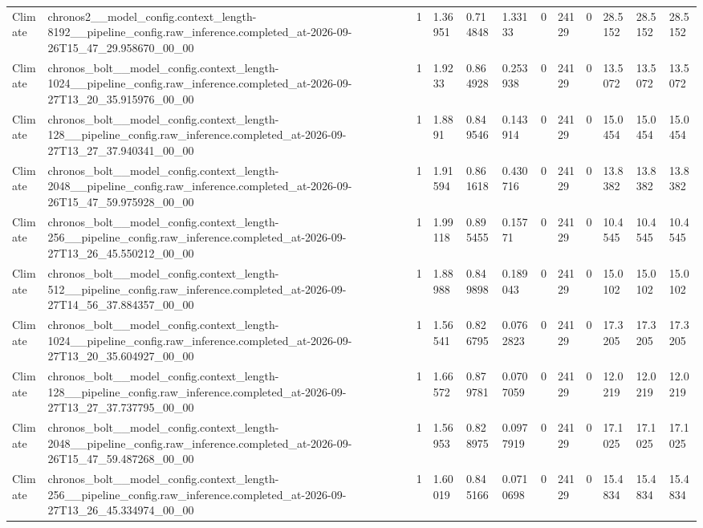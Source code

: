 \begin{tabular}{llllllllllll}
Climate & chronos2\_\_model\_config.context\_length-8192\_\_pipeline\_config.raw\_inference.completed\_at-2026-09-26T15\_47\_29.958670\_00\_00 & 1 & 1.36951 & 0.714848 & 1.33133 & 0 & 24129 & 0 & 28.5152 & 28.5152 & 28.5152 \\
Climate & chronos\_bolt\_\_model\_config.context\_length-1024\_\_pipeline\_config.raw\_inference.completed\_at-2026-09-27T13\_20\_35.915976\_00\_00 & 1 & 1.9233 & 0.864928 & 0.253938 & 0 & 24129 & 0 & 13.5072 & 13.5072 & 13.5072 \\
Climate & chronos\_bolt\_\_model\_config.context\_length-128\_\_pipeline\_config.raw\_inference.completed\_at-2026-09-27T13\_27\_37.940341\_00\_00 & 1 & 1.8891 & 0.849546 & 0.143914 & 0 & 24129 & 0 & 15.0454 & 15.0454 & 15.0454 \\
Climate & chronos\_bolt\_\_model\_config.context\_length-2048\_\_pipeline\_config.raw\_inference.completed\_at-2026-09-26T15\_47\_59.975928\_00\_00 & 1 & 1.91594 & 0.861618 & 0.430716 & 0 & 24129 & 0 & 13.8382 & 13.8382 & 13.8382 \\
Climate & chronos\_bolt\_\_model\_config.context\_length-256\_\_pipeline\_config.raw\_inference.completed\_at-2026-09-27T13\_26\_45.550212\_00\_00 & 1 & 1.99118 & 0.895455 & 0.15771 & 0 & 24129 & 0 & 10.4545 & 10.4545 & 10.4545 \\
Climate & chronos\_bolt\_\_model\_config.context\_length-512\_\_pipeline\_config.raw\_inference.completed\_at-2026-09-27T14\_56\_37.884357\_00\_00 & 1 & 1.88988 & 0.849898 & 0.189043 & 0 & 24129 & 0 & 15.0102 & 15.0102 & 15.0102 \\
Climate & chronos\_bolt\_\_model\_config.context\_length-1024\_\_pipeline\_config.raw\_inference.completed\_at-2026-09-27T13\_20\_35.604927\_00\_00 & 1 & 1.56541 & 0.826795 & 0.0762823 & 0 & 24129 & 0 & 17.3205 & 17.3205 & 17.3205 \\
Climate & chronos\_bolt\_\_model\_config.context\_length-128\_\_pipeline\_config.raw\_inference.completed\_at-2026-09-27T13\_27\_37.737795\_00\_00 & 1 & 1.66572 & 0.879781 & 0.0707059 & 0 & 24129 & 0 & 12.0219 & 12.0219 & 12.0219 \\
Climate & chronos\_bolt\_\_model\_config.context\_length-2048\_\_pipeline\_config.raw\_inference.completed\_at-2026-09-26T15\_47\_59.487268\_00\_00 & 1 & 1.56953 & 0.828975 & 0.0977919 & 0 & 24129 & 0 & 17.1025 & 17.1025 & 17.1025 \\
Climate & chronos\_bolt\_\_model\_config.context\_length-256\_\_pipeline\_config.raw\_inference.completed\_at-2026-09-27T13\_26\_45.334974\_00\_00 & 1 & 1.60019 & 0.845166 & 0.0710698 & 0 & 24129 & 0 & 15.4834 & 15.4834 & 15.4834 \\

\end{tabular}

